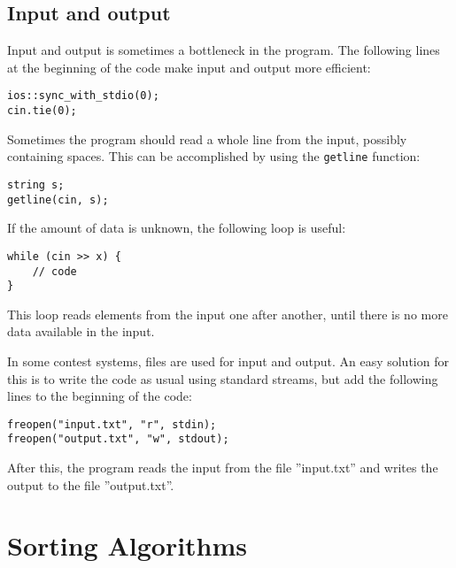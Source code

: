 \documentclass[twoside,12pt,a4paper,english]{book}
\theoremstyle{definition}
\theoremstyle{problemstyle}
\theoremstyle{problemstyle}
\theoremstyle{problemstyle}
\begin{document}
\section{Input and output}
Input and output is sometimes
a bottleneck in the program.
The following lines at the beginning of the code
make input and output more efficient:

\begin{lstlisting}
ios::sync_with_stdio(0);
cin.tie(0);
\end{lstlisting}

Sometimes the program should read a whole line
from the input, possibly containing spaces.
This can be accomplished by using the
\texttt{getline} function:

\begin{lstlisting}
string s;
getline(cin, s);
\end{lstlisting}

If the amount of data is unknown, the following
loop is useful:
\begin{lstlisting}
while (cin >> x) {
    // code
}
\end{lstlisting}
This loop reads elements from the input
one after another, until there is no
more data available in the input.

In some contest systems, files are used for
input and output.
An easy solution for this is to write
the code as usual using standard streams,
but add the following lines to the beginning of the code:
\begin{lstlisting}
freopen("input.txt", "r", stdin);
freopen("output.txt", "w", stdout);
\end{lstlisting}
After this, the program reads the input from the file
''input.txt'' and writes the output to the file
''output.txt''.

\chapter{Sorting Algorithms}
\end{document}
